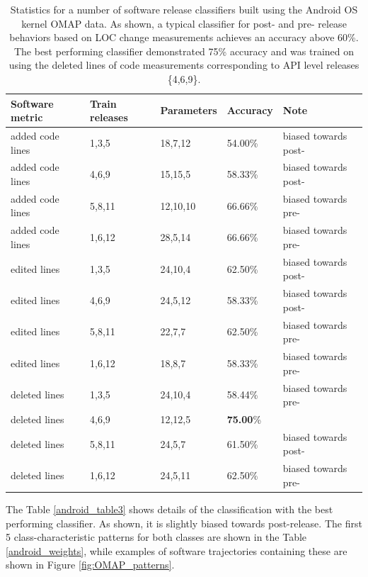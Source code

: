 \begin{table}
\begin{tabularx}{\linewidth}{l X X X l}
\toprule
Software metric & Train releases  & Parameters      & Accuracy        & Note\\
\midrule
added code lines &       1,3,5 &  18,7,12& 54.00\% & biased towards post-\\
added code lines &        4,6,9 &  15,15,5 &58.33\% & biased towards post-\\
added code lines &      5,8,11 & 12,10,10 &       66.66\% & biased towards pre-\\
added code lines &       1,6,12 & 28,5,14& 66.66\% & biased towards pre-\\
edited lines &   1,3,5  & 24,10,4& 62.50\%& biased towards post-\\
edited lines &   4,6,9  & 24,5,12& 58.33\% & biased towards post-\\
edited lines &   5,8,11&  22,7,7 & 62.50\%  &biased towards pre-\\
edited lines &   1,6,12 & 18,8,7 & 58.33\% & biased towards pre-\\
deleted lines &  1,3,5  & 24,10,4& 58.44\% & biased towards pre-\\
deleted lines &  4,6,9  & 12,12,5 &\textbf{75.00}\%  & \\
deleted lines &  5,8,11&  24,5,7 & 61.50\% & biased towards post-\\
deleted lines &  1,6,12 & 24,5,11 &62.50\% & biased towards pre-\\
\bottomrule
\end{tabularx}
\caption{Statistics for a number of software release classifiers built using the Android OS kernel OMAP data. As shown, a typical classifier for post- and pre- release behaviors based on LOC change measurements achieves an accuracy above 60\%. The best performing classifier demonstrated 75\% accuracy and was trained on using the deleted lines of code measurements corresponding to API level releases \{4,6,9\}.}
\label{android_accuracy}
\end{table}

The Table \ref{android_table3} shows details of the classification with the best performing classifier. As shown, it is slightly biased towards post-release. The first 5 class-characteristic patterns for both classes are shown in the Table \ref{android_weights}, while examples of software trajectories containing these are shown in Figure \ref{fig:OMAP_patterns}.

